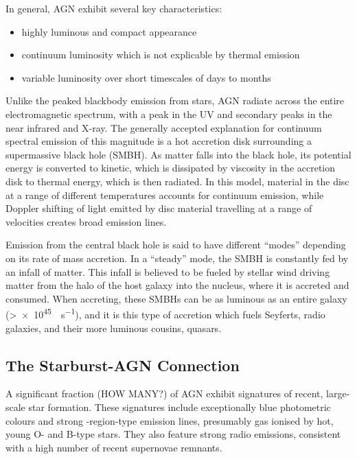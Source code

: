 \documentclass[a4paper,11pt]{article}
\begin{document}
In general, AGN exhibit several key characteristics:

\begin{itemize}
    \item highly luminous and compact appearance
    \item continuum luminosity which is not explicable by thermal emission
    \item variable luminosity over short timescales of days to months
\end{itemize}

Unlike the peaked blackbody emission from stars, AGN radiate across the entire electromagnetic spectrum, with a peak in the UV and secondary peaks in the near infrared and X-ray. The generally accepted explanation for continuum spectral emission of this magnitude is a hot accretion disk surrounding a supermassive black hole (SMBH).\cite{Sparke_2000} As matter falls into the black hole, its potential energy is converted to kinetic, which is dissipated by viscosity in the accretion disk to thermal energy, which is then radiated. In this model, material in the disc at a range of different temperatures accounts for continuum emission, while Doppler shifting of light emitted by disc material travelling at a range of velocities creates broad emission lines.\cite{Peterson_1997}

Emission from the central black hole is said to have different ``modes'' depending on its rate of mass accretion. In a ``steady'' mode, the SMBH is constantly fed by an infall of matter.\cite{Romero_Canizales_2016, Shields_1978} This infall is believed to be fueled by stellar wind driving matter from the halo of the host galaxy into the nucleus, where it is accreted and consumed. When accreting, these SMBHs can be as luminous as an entire galaxy (\textgreater\SI{e45}{\erg\per\second}), and it is this type of accretion which fuels Seyferts, radio galaxies, and their more luminous cousins, quasars.\cite{Kormendy_2013, Peterson_1997}

\subsection{The Starburst-AGN Connection}\label{sec:starburst_agn_connection}

A significant fraction (HOW MANY?) of AGN exhibit signatures of recent, large-scale star formation. These signatures include exceptionally blue photometric colours and strong -region-type emission lines, presumably gas ionised by hot, young O- and B-type stars. They also feature strong radio emissions, consistent with a high number of recent supernovae remnants.\cite{Peterson_1997}
\end{document}
